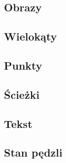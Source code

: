 \subsection{Obrazy}


\subsection{Wielokąty}


\subsection{Punkty}


\subsection{Ścieżki}


\subsection{Tekst}


\subsection{Stan pędzli}
